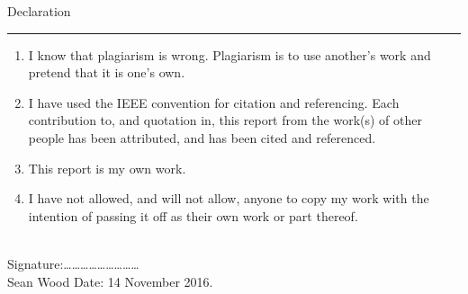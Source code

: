 \thispagestyle{empty}
\vskip 40mm

{\Large Declaration}\\
\hrule

\vskip 10mm
\begin{enumerate}
\item I know that plagiarism is wrong. Plagiarism is to use another's work and pretend that it is one's
own.
\item I have used the IEEE convention for citation and referencing. Each contribution to, and quotation in,
this report from the work(s) of other people has been attributed, and has been cited and
referenced.
\item This report is my own work.
\item I have not allowed, and will not allow, anyone to copy my work with the intention of passing it off
as their own work or part thereof.
\end{enumerate}
\vskip 10mm

\hspace{2cm}\\
Signature:\ldots\ldots\ldots\ldots\ldots\ldots\ldots\ldots\ldots 
\\\hspace{2cm}Sean Wood 		%
\vskip10mm
Date: 14 November 2016.


\fancyfoot[C]{\thepage}